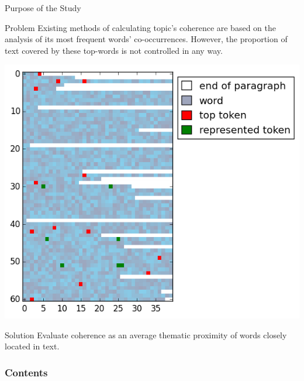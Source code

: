 \documentclass[russian]{beamer}
\begin{document}
\begin{frame}{Purpose of the Study}
  \begin{minipage}{0.4\textwidth}
  \begin{block}{Problem}
    Existing methods of calculating topic's coherence are based on the analysis of its most frequent words' co-occurrences.
    However, the proportion of text covered by these top-words is not controlled in any way.
  \end{block}
  \end{minipage}
  \begin{minipage}{0.1\textwidth}
  \phantom{W}
  \end{minipage}
  \begin{minipage}{0.5\textwidth}
      \includegraphics[width=\textwidth]{doc10399_topic_0.png}
  \end{minipage}
  \begin{block}{Solution}
    Evaluate coherence as an average thematic proximity of words closely located in text.
  \end{block}
\end{frame}


\begin{frame}
  \frametitle{Contents}
  \tableofcontents
\end{frame}
\end{document}
